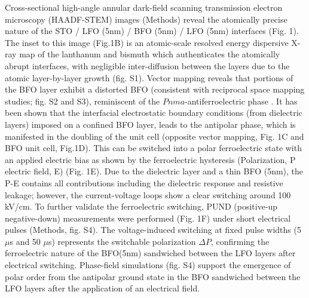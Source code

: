 \documentclass[12pt]{article}
\begin{document}
Cross-sectional high-angle annular dark-field scanning transmission electron microscopy (HAADF-STEM) images (Methods) reveal the atomically precise nature of the STO / LFO (5nm) / BFO (5nm) / LFO (5nm) interfaces (Fig. 1). The inset to this image (Fig.1B) is an atomic-scale resolved energy dispersive X-ray map of the lanthanum and bismuth which authenticates the atomically abrupt interfaces, with negligible inter-diffusion between the layers due to the atomic layer-by-layer growth (fig. S1). Vector mapping reveals that portions of the BFO layer exhibit a distorted BFO (consistent with reciprocal space mapping studies; fig. S2 and S3), reminiscent of the $Pnma$-antiferroelectric phase \cite{mundy2022liberating,caretta2023non}. It has been shown that the interfacial electrostatic boundary conditions (from dielectric layers) imposed on a confined BFO layer, leads to the antipolar phase, which is manifested in the doubling of the unit cell (opposite vector mapping, Fig. 1C and BFO unit cell, Fig.1D). This can be switched into a polar ferroelectric state with an applied electric bias\cite{mundy2022liberating,caretta2023non,borisevich2010suppression} as shown by the ferroelectric hysteresis (Polarization, P electric field, E) (Fig. 1E). Due to the dielectric layer and a thin BFO (5nm), the P-E contains all contributions including the dielectric response and resistive leakage; however, the current-voltage loops show a clear switching around 100 kV/cm. To further validate the ferroelectric switching, PUND (positive-up negative-down) measurements were performed (Fig. 1F)  under short electrical pulses (Methods, fig. S4). The voltage-induced switching at fixed pulse widths (5 $\mu$s and 50 $\mu$s) represents the switchable polarization $\Delta P$, confirming the ferroelectric nature of the BFO(5nm) sandwiched between the LFO layers after electrical switching. Phase-field simulations (fig. S4) support the emergence of polar order from the antipolar ground state in the BFO sandwiched between the LFO layers after the application of an electrical field.
\end{document}
